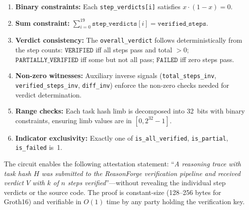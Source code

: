 \documentclass[11pt,a4paper]{article}
\begin{document}
\begin{enumerate}[nosep]
  \item \textbf{Binary constraints:} Each \texttt{step\_verdicts[i]}
    satisfies $x \cdot (1 - x) = 0$.
  \item \textbf{Sum constraint:}
    $\sum_{i=0}^{19} \texttt{step\_verdicts}[i] = \texttt{verified\_steps}$.
  \item \textbf{Verdict consistency:} The \texttt{overall\_verdict}
    follows deterministically from the step counts:
    $\texttt{VERIFIED}$ iff all steps pass and total $> 0$;
    $\texttt{PARTIALLY\_VERIFIED}$ iff some but not all pass;
    $\texttt{FAILED}$ iff zero steps pass.
  \item \textbf{Non-zero witnesses:} Auxiliary inverse signals
    (\texttt{total\_steps\_inv}, \texttt{verified\_steps\_inv},
    \texttt{diff\_inv}) enforce the non-zero checks needed for verdict
    determination.
  \item \textbf{Range checks:} Each task hash limb is decomposed into
    32~bits with binary constraints, ensuring limb values are in
    $[0, 2^{32} - 1]$.
  \item \textbf{Indicator exclusivity:} Exactly one of
    \texttt{is\_all\_verified}, \texttt{is\_partial},
    \texttt{is\_failed} is~1.
\end{enumerate}

The circuit enables the following attestation statement: ``\emph{A
reasoning trace with task hash $H$ was submitted to the ReasonForge
verification pipeline and received verdict $V$ with $k$ of $n$ steps
verified}''---without revealing the individual step verdicts or the
source code.  The proof is constant-size (128--256 bytes for Groth16) and
verifiable in $O(1)$ time by any party holding the verification key.
\end{document}
